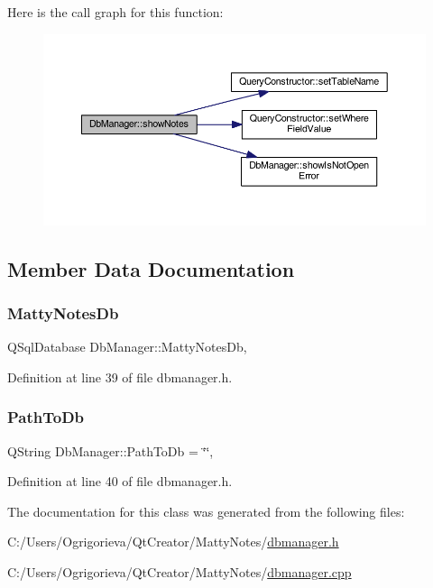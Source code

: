 Here is the call graph for this function\+:
\nopagebreak
\begin{figure}[H]
\begin{center}
\leavevmode
\includegraphics[width=350pt]{classDbManager_a6e04515110041436021b5ee0f068eda2_cgraph}
\end{center}
\end{figure}


\subsection{Member Data Documentation}
\hypertarget{classDbManager_a3f6052f559a7a72eef66848ebc9f3eaa}{}\label{classDbManager_a3f6052f559a7a72eef66848ebc9f3eaa} 
\subsubsection{\texorpdfstring{Matty\+Notes\+Db}{MattyNotesDb}}
{\footnotesize\ttfamily Q\+Sql\+Database Db\+Manager\+::\+Matty\+Notes\+Db\hspace{0.3cm}{\ttfamily [static]}, {\ttfamily [private]}}



Definition at line 39 of file dbmanager.\+h.

\hypertarget{classDbManager_aa3f62582e546ee853cebd75386e26736}{}\label{classDbManager_aa3f62582e546ee853cebd75386e26736} 
\subsubsection{\texorpdfstring{Path\+To\+Db}{PathToDb}}
{\footnotesize\ttfamily Q\+String Db\+Manager\+::\+Path\+To\+Db = \char`\"{}\char`\"{}\hspace{0.3cm}{\ttfamily [static]}, {\ttfamily [private]}}



Definition at line 40 of file dbmanager.\+h.



The documentation for this class was generated from the following files\+:\begin{DoxyCompactItemize}
\item 
C\+:/\+Users/\+Ogrigorieva/\+Qt\+Creator/\+Matty\+Notes/\hyperlink{dbmanager_8h}{dbmanager.\+h}\item 
C\+:/\+Users/\+Ogrigorieva/\+Qt\+Creator/\+Matty\+Notes/\hyperlink{dbmanager_8cpp}{dbmanager.\+cpp}\end{DoxyCompactItemize}

